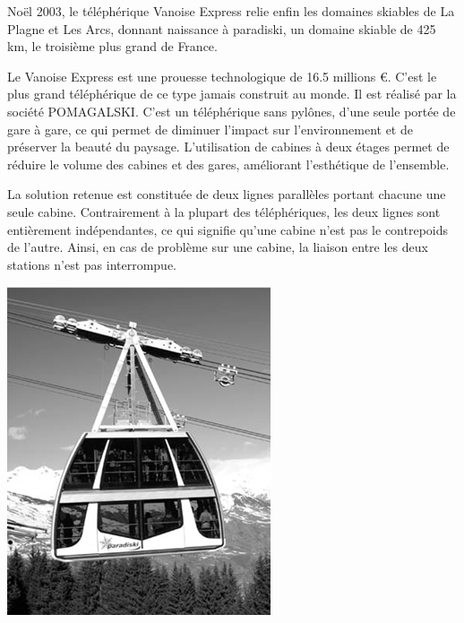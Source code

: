 \documentclass[10pt,fleqn]{article} %
\begin{document}
\noindent\begin{minipage}[c]{.6\linewidth}

Noël 2003, le téléphérique Vanoise Express relie enfin les domaines skiables de La Plagne et Les Arcs, donnant naissance à paradiski, un domaine skiable de 425 km, le troisième plus grand de France.

	Le Vanoise Express est une prouesse technologique de 16.5 millions €. C’est le plus grand téléphérique de ce type jamais construit au monde. Il est réalisé par la société POMAGALSKI. C’est un téléphérique sans pylônes, d’une seule portée de gare à gare, ce qui permet de diminuer l’impact sur l’environnement et de préserver la beauté du paysage. L’utilisation de cabines à deux étages permet de réduire le volume des cabines et des gares, améliorant l’esthétique de l’ensemble.
	
	La solution retenue est constituée de deux lignes parallèles portant chacune une seule cabine. Contrairement à la plupart des téléphériques, les deux lignes sont entièrement indépendantes, ce qui signifie qu’une cabine n’est pas le contrepoids de l’autre. Ainsi, en cas de problème sur une cabine, la liaison entre les deux stations n’est pas interrompue.


\end{minipage}\hfill
\begin{minipage}[c]{.36\linewidth}
\begin{center}
\includegraphics[width=.95\linewidth]{images2/fig_00}
\end{center}
\end{minipage}
\end{document}
